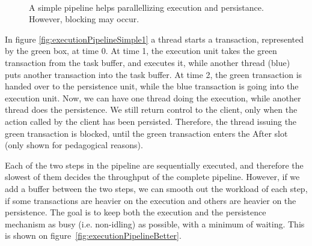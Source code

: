 \begin{figure}[h]
\centering
{}\\
\caption{A simple pipeline helps parallellizing execution and persistance. However, blocking may occur.}
\label{fig:executionPipelineSimple}
\end{figure}In figure \ref{fig:executionPipelineSimple1} a thread starts a transaction,
represented by the green box, at time 0. At time 1, the execution
unit takes the green transaction from the task buffer, and executes
it, while another thread (blue) puts another transaction into the
task buffer. At time 2, the green transaction is handed over to the
persistence unit, while the blue transaction is going into the execution
unit. Now, we can have one thread doing the execution, while another
thread does the persistence. We still return control to the client,
only when the action called by the client has been persisted. Therefore,
the thread issuing the green transaction is blocked, until the green
transaction enters the After slot (only shown for pedagogical reasons).

Each of the two steps in the pipeline are sequentially executed, and
therefore the slowest of them decides the throughput of the complete
pipeline. However, if we add a buffer between the two steps, we can
smooth out the workload of each step, if some transactions are heavier
on the execution and others are heavier on the persistence. The goal
is to keep both the execution and the persistence mechanism as busy
(i.e. non-idling) as possible, with a minimum of waiting. This is
shown on figure~\ref{fig:executionPipelineBetter}. 

